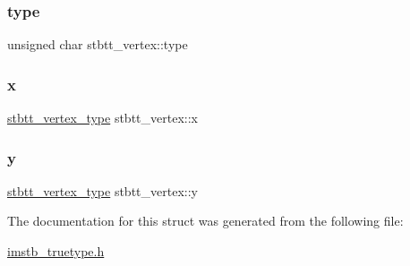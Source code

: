 \subsubsection{\texorpdfstring{type}{type}}
{\footnotesize\ttfamily unsigned char stbtt\+\_\+vertex\+::type}

\mbox{\label{structstbtt__vertex_a81773edbe760d0e090561a3c1e86c919}} 
\subsubsection{\texorpdfstring{x}{x}}
{\footnotesize\ttfamily \mbox{\hyperlink{imstb__truetype_8h_ab8fd8e5e0b82b0f7da54532035e47b22}{stbtt\+\_\+vertex\+\_\+type}} stbtt\+\_\+vertex\+::x}

\mbox{\label{structstbtt__vertex_a9052065ca544b63d537325b246928cfc}} 
\subsubsection{\texorpdfstring{y}{y}}
{\footnotesize\ttfamily \mbox{\hyperlink{imstb__truetype_8h_ab8fd8e5e0b82b0f7da54532035e47b22}{stbtt\+\_\+vertex\+\_\+type}} stbtt\+\_\+vertex\+::y}



The documentation for this struct was generated from the following file\+:\begin{DoxyCompactItemize}
\item 
\mbox{\hyperlink{imstb__truetype_8h}{imstb\+\_\+truetype.\+h}}\end{DoxyCompactItemize}
